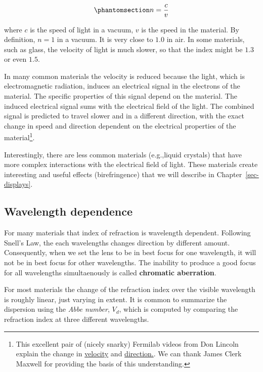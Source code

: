 \documentclass[
  letterpaper,
]{book}
\begin{document}
\begin{equation}\phantomsection\label{eq-indexofrefraction}{ 
n = \frac{c}{v} 
}\end{equation}

where \(c\) is the speed of light in a vacuum, \(v\) is the speed in the
material. By definition, \(n=1\) in a vacuum. It is very close to
\(1.0\) in air. In some materials, such as glass, the velocity of light
is much slower, so that the index might be \(1.3\) or even \(1.5\).

In many common materials the velocity is reduced because the light,
which is electromagnetic radiation, induces an electrical signal in the
electrons of the material. The specific properties of this signal depend
on the material. The induced electrical signal sums with the electrical
field of the light. The combined signal is predicted to travel slower
and in a different direction, with the exact change in speed and
direction dependent on the electrical properties of the
material\footnote{This excellent pair of (nicely snarky) Fermilab videos
  from Don Lincoln explain the change in
  \href{https://www.youtube.com/watch?v=CUjt36SD3h8}{velocity} and
  \href{https://www.youtube.com/watch?v=NLmpNM0sgYk}{direction.}. We can
  thank James Clerk Maxwell for providing the basis of this
  understanding.}.

Interestingly, there are less common materials (e.g.,liquid crystals)
that have more complex interactions with the electrical field of light.
These materials create interesting and useful effects (birefringence)
that we will describe in Chapter~\ref{sec-displays}.

\subsection{Wavelength dependence}\label{sec-chromatic-aberration}

For many materials that index of refraction is wavelength dependent.
Following Snell's Law, the each wavelengths changes direction by
different amount. Consequently, when we set the lens to be in best focus
for one wavelength, it will not be in best focus for other wavelengths.
The inability to produce a good focus for all wavelengths simultaenously
is called \textbf{chromatic aberration}.

For most materials the change of the refraction index over the visible
wavelength is roughly linear, just varying in extent. It is common to
summarize the dispersion using the \emph{Abbe number}, \(V_d\), which is
computed by comparing the refraction index at three different
wavelengths.
\end{document}
